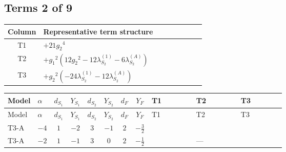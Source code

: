 \documentclass[8pt]{article}
\begin{document}
\begin{landscape}
\subsection*{Terms 2 of 9}
\begin{center}
\begin{tabular}{@{}c >{\raggedright\arraybackslash}p{0.82\linewidth}@{}}
\toprule
Column & Representative term structure \\
\midrule
T1 & \(\displaystyle +21 {g_2}^4\) \\
\midrule
T2 & \(\displaystyle +{g_1}^2 \left(12 {g_2}^2-12 {\lambda_{S_2}^{(1)}}-6 {\lambda_{S_2}^{(A)}}\right)\) \\
\midrule
T3 & \(\displaystyle +{g_2}^2 (-24 {\lambda_{S_2}^{(1)}}-12 {\lambda_{S_2}^{(A)}})\) \\
\midrule
\bottomrule
\end{tabular}
\end{center}
\smallskip
\tiny
\begin{longtable}{@{}llcccccc >{\raggedright\arraybackslash}p{0.21\linewidth} >{\raggedright\arraybackslash}p{0.21\linewidth} >{\raggedright\arraybackslash}p{0.21\linewidth}@{}}
\toprule
Model & $\alpha$ & $d_{S_1}$ & $Y_{S_1}$ & $d_{S_2}$ & $Y_{S_2}$ & $d_F$ & $Y_F$ & T1 & T2 & T3 \\
\midrule
\endfirsthead
\toprule
Model & $\alpha$ & $d_{S_1}$ & $Y_{S_1}$ & $d_{S_2}$ & $Y_{S_2}$ & $d_F$ & $Y_F$ & T1 & T2 & T3 \\
\midrule
\endhead
T3-A & $-4$ & $1$ & $-2$ & $3$ & $-1$ & $2$ & $-\frac{3}{2}$ & \scriptsize\adjustbox{max width=\linewidth}{$\begin{gathered} +21 {g_2}^4\end{gathered}$} & \scriptsize\adjustbox{max width=\linewidth}{$\begin{gathered} +{g_1}^2 \left(12 {g_2}^2-12 {\lambda_{S_2}^{(1)}}-6 {\lambda_{S_2}^{(A)}}\right)\end{gathered}$} & \scriptsize\adjustbox{max width=\linewidth}{$\begin{gathered} +{g_2}^2 (-24 {\lambda_{S_2}^{(1)}}-12 {\lambda_{S_2}^{(A)}})\end{gathered}$} \\
\midrule
T3-A & $-2$ & $1$ & $-1$ & $3$ & $0$ & $2$ & $-\frac{1}{2}$ & \scriptsize\adjustbox{max width=\linewidth}{$\begin{gathered} +21 {g_2}^4\end{gathered}$} & --- & \scriptsize\adjustbox{max width=\linewidth}{$\begin{gathered} +{g_2}^2 (-24 {\lambda_{S_2}^{(1)}}-12 {\lambda_{S_2}^{(A)}})\end{gathered}$} \\

\end{longtable}
\end{landscape}
\end{document}
